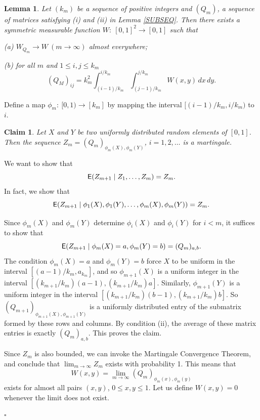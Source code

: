 \documentclass[fleqn]{article}
\newtheorem{lemma}[theorem]{Lemma}
\newtheorem{claim}[theorem]{Claim}
\newenvironment{proof}{\noindent{\bf Proof. }}{\hfill$\square$\medskip}
\begin{document}
\begin{lemma}\label{W-EXISTS}
Let $(k_m)$ be a sequence of positive integers and $(Q_m)$, a
sequence of matrices satisfying {\rm (i)} and {\rm (ii)} in Lemma
\ref{SUBSEQ}. Then there exists a symmetric measurable function
$W:~[0,1]^2\to [0,1]$ such that

{\rm (a)} $W_{Q_m}\to W~ (m\to\infty)$ almost everywhere;

\smallskip

{\rm (b)} for all $m$ and $1\le i,j\le k_m$
\[
(Q_M)_{ij}=k_m^2\int_{(i-1)/k_m}^{i/k_m}\int_{(j-1)/k_m}^{j/k_m}
W(x,y)\,dx\,dy.
\]
\end{lemma}


\begin{proof}
Define a map $\phi_m:~[0,1)\to[k_m]$ by mapping the interval
$[(i-1)/k_m,i/k_m)$ to $i$.

\begin{claim}\label{MARTINGAL}
Let $X$ and $Y$ be two uniformly distributed random elements of
$[0,1]$. Then the sequence $Z_m=(Q_m)_{\phi_m(X),\phi_m(Y)}$,
$i=1,2,\dots$ is a martingale.
\end{claim}

We want to show that
\begin{equation}\label{MARTIN-1}
{\sf E}(Z_{m+1}\mid Z_1,\dots,Z_m)=Z_m.
\end{equation}
In fact, we show that
\begin{equation}\label{MARTIN-2}
{\sf E}(Z_{m+1}\mid \phi_1(X),\phi_1(Y),\dots,\phi_m(X),\phi_m(Y))=Z_m.
\end{equation}

Since $\phi_m(X)$ and $\phi_m(Y)$ determine $\phi_i(X)$ and
$\phi_i(Y)$ for $i<m$, it suffices to show that
\begin{equation}\label{MARTIN-3}
{\sf E}(Z_{m+1}\mid \phi_m(X)=a,\phi_m(Y)=b)=(Q_m)_{a,b}.
\end{equation}
The condition $\phi_m(X)=a$ and $\phi_m(Y)=b$ force $X$ to be uniform
in the interval $[(a-1)/k_m,a_{k_m}]$, and so $\phi_{m+1}(X)$ is a
uniform integer in the interval
$[(k_{m+1}/k_m)(a-1),(k_{m+1}/k_m)a]$. Similarly, $\phi_{m+1}(Y)$ is
a uniform integer in the interval
$[(k_{m+1}/k_m)(b-1),(k_{m+1}/k_m)b]$. So
$(Q_{m+1})_{\phi_{m+1}(X),\phi_{m+1}(Y)}$ is a uniformly distributed
entry of the submatrix formed by these rows and columns. By condition
(ii), the average of these matrix entries is exactly $(Q_m)_{a,b}$.
This proves the claim.

Since $Z_m$ is also bounded, we can invoke the Martingale Convergence
Theorem, and conclude that $\lim_{m\to\infty} Z_m$ exists with
probability 1. This means that
\[
W(x,y)=\lim_{m\to\infty} (Q_m)_{\phi_m(x),\phi_m(y)}
\]
exists for almost all pairs $(x,y)$, $0\le x,y\le 1$. Let us define
$W(x,y)=0$ whenever the limit does not exist.


\end{proof}
\end{document}
